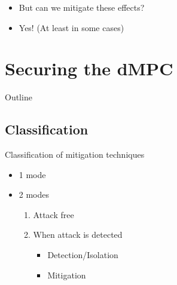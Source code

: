 \documentclass[handout,aspectratio=169]{beamer}
\begin{document}
\begin{frame}{}
  \begin{itemize}[<+->]
    \item But can we mitigate these effects?
    \item Yes! (At least in some cases)
  \end{itemize}
\end{frame}

\section{Securing the dMPC}

\begin{frame}{Outline}
  \tableofcontents[sectionstyle=show/hide,subsectionstyle=show/show/show,subsubsectionstyle=hide]
\end{frame}

\subsection{Classification}

\begin{frame}{Classification of mitigation techniques}
  \begin{minipage}[t]{.45\linewidth}
    \begin{itemize}
      \item<2-> 1 mode
    \end{itemize}
  \end{minipage}
  \hfill
  \begin{minipage}[t]{.45\linewidth}
    \begin{itemize}
      \item<2-> 2 modes
            \begin{enumerate}
              \item<3-> Attack free
              \item<3-> When attack is detected
                    \begin{itemize}
                      \item<4-> Detection/Isolation
                      \item<4-> Mitigation
                    \end{itemize}
            \end{enumerate}
    \end{itemize}
  \end{minipage}
\end{frame}
\end{document}
